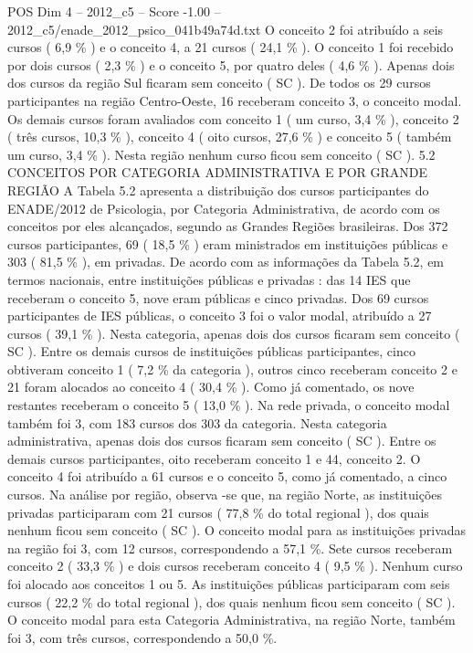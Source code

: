 \begin{textsample}{POS Dim 4 – 2012\_c5 – Score -1.00 – 2012\_c5/enade\_2012\_psico\_041b49a74d.txt}
O conceito 2 foi atribuído a seis cursos ( 6,9 \% ) e o conceito 4, a 21 cursos ( 24,1 \% ).
O conceito 1 foi recebido por dois cursos ( 2,3 \% ) e o conceito 5, por quatro deles ( 4,6 \% ).
Apenas dois dos cursos da região Sul ficaram sem conceito ( SC ).
De todos os 29 cursos participantes na região Centro-Oeste, 16 receberam conceito 3, o conceito modal.
Os demais cursos foram avaliados com conceito 1 ( um curso, 3,4 \% ), conceito 2 ( três cursos, 10,3 \% ), conceito 4 ( oito cursos, 27,6 \% ) e conceito 5 ( também um curso, 3,4 \% ).
Nesta região nenhum curso ficou sem conceito ( SC ). 5.2 CONCEITOS POR CATEGORIA ADMINISTRATIVA E POR GRANDE REGIÃO A Tabela 5.2 apresenta a distribuição dos cursos participantes do ENADE/2012 de Psicologia, por Categoria Administrativa, de acordo com os conceitos por eles alcançados, segundo as Grandes Regiões brasileiras.
Dos 372 cursos participantes, 69 ( 18,5 \% ) eram ministrados em instituições públicas e 303 ( 81,5 \% ), em privadas.
De acordo com as informações da Tabela 5.2, em termos nacionais, entre instituições públicas e privadas : das 14 IES que receberam o conceito 5, nove eram públicas e cinco privadas.
Dos 69 cursos participantes de IES públicas, o conceito 3 foi o valor modal, atribuído a 27 cursos ( 39,1 \% ).
Nesta categoria, apenas dois dos cursos ficaram sem conceito ( SC ).
Entre os demais cursos de instituições públicas participantes, cinco obtiveram conceito 1 ( 7,2 \% da categoria ), outros cinco receberam conceito 2 e 21 foram alocados ao conceito 4 ( 30,4 \% ).
Como já comentado, os nove restantes receberam o conceito 5 ( 13,0 \% ).
Na rede privada, o conceito modal também foi 3, com 183 cursos dos 303 da categoria.
Nesta categoria administrativa, apenas dois dos cursos ficaram sem conceito ( SC ).
Entre os demais cursos participantes, oito receberam conceito 1 e 44, conceito 2.
O conceito 4 foi atribuído a 61 cursos e o conceito 5, como já comentado, a cinco cursos.
Na análise por região, observa -se que, na região Norte, as instituições privadas participaram com 21 cursos ( 77,8 \% do total regional ), dos quais nenhum ficou sem conceito ( SC ).
O conceito modal para as instituições privadas na região foi 3, com 12 cursos, correspondendo a 57,1 \%.
Sete cursos receberam conceito 2 ( 33,3 \% ) e dois cursos receberam conceito 4 ( 9,5 \% ).
Nenhum curso foi alocado aos conceitos 1 ou 5.
As instituições públicas participaram com seis cursos ( 22,2 \% do total regional ), dos quais nenhum ficou sem conceito ( SC ).
O conceito modal para esta Categoria Administrativa, na região Norte, também foi 3, com três cursos, correspondendo a 50,0 \%.

\end{textsample}
